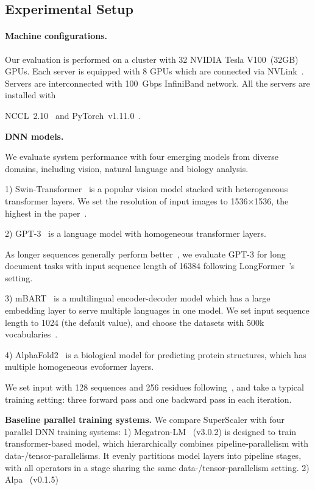 \subsection{Experimental Setup}

\paragraph{Machine configurations.} Our evaluation is performed on a cluster with 32 NVIDIA Tesla V100~(32GB) GPUs. Each server is equipped with 8 GPUs which are connected via NVLink~\cite{NVLINK}. Servers are interconnected with 100~Gbps InfiniBand network. All the servers are installed with 

NCCL~2.10~\cite{NCCL} and PyTorch~v1.11.0~\cite{PyTorch}.

{\bf  DNN models. }

We evaluate system performance with four emerging models from diverse domains, including vision, natural language and biology analysis.

1) Swin-Transformer~\cite{swin-v2} is a popular vision model stacked with heterogeneous transformer layers. We set the resolution of input images to 1536$\times$1536, the highest in the paper~\cite{swin-v2}.

2) GPT-3~\cite{gpt-3} is a language model with homogeneous transformer layers. 

As longer sequences generally perform better~\cite{long-sequence-1, long-sequence-2}, we evaluate GPT-3 for long document tasks with input sequence length of 16384 following LongFormer~\cite{long-sequence-2}'s setting.

3) mBART~\cite{mbart} is a multilingual encoder-decoder model which has a large embedding layer to serve multiple languages in one model. We set input sequence length to 1024 (the default value), and choose the datasets with 500k vocabularies~\cite{vocab500k}.

4) AlphaFold2~\cite{alphafold} is a biological model for predicting protein structures, which has multiple homogeneous evoformer layers.

We set input with 128 sequences and 256 residues following~\cite{alphafold}, and take a typical training setting: three forward pass and one backward pass in each iteration.

{\bf  Baseline parallel training systems. } We compare {SuperScaler} with four parallel DNN training systems: 1) Megatron-LM~\cite{megatron2} (v3.0.2) is designed to train transformer-based model, which hierarchically combines pipeline-parallelism with data-/tensor-parallelisms. It evenly partitions model layers into pipeline stages, with all operators in a stage sharing the same data-/tensor-parallelism setting. 2) Alpa~\cite{alpa} (v0.1.5) 

